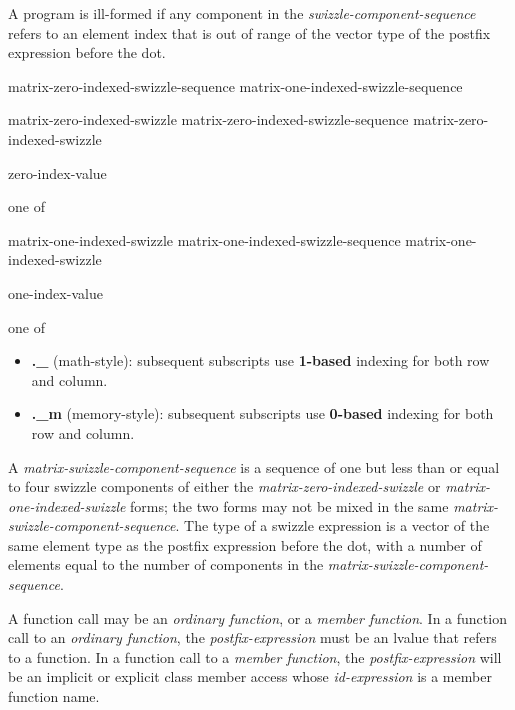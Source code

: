 \p A program is ill-formed if any component in the \textit{swizzle-component-sequence}
refers to an element index that is out of range of the vector type of the
postfix expression before the dot.

\begin{grammar}
  \br
  matrix-zero-indexed-swizzle-sequence\br
  matrix-one-indexed-swizzle-sequence\br

  \br
  matrix-zero-indexed-swizzle\br
  matrix-zero-indexed-swizzle-sequence matrix-zero-indexed-swizzle\br

  \br
   zero-index-value\br

   \textnormal{one of}\br
  \br

  \br
  matrix-one-indexed-swizzle\br
  matrix-one-indexed-swizzle-sequence matrix-one-indexed-swizzle\br

  \br
   one-index-value\br

   \textnormal{one of}\br
  \br
\end{grammar}
\begin{itemize}
\item \textbf{.\_} (math-style): subsequent subscripts use \textbf{1-based}
 indexing for both row and column.
\item \textbf{.\_m} (memory-style): subsequent subscripts use \textbf{0-based}
 indexing for both row and column.
\end{itemize}

\p A \textit{matrix-swizzle-component-sequence} is a sequence of one but less
than or equal to four swizzle components of either the
\textit{matrix-zero-indexed-swizzle} or \textit{matrix-one-indexed-swizzle}
forms; the two forms may not be mixed in the same 
\textit{matrix-swizzle-component-sequence}. The type of a swizzle expression is
a vector of the same element type as the postfix expression before the dot,
with a number of elements equal to the number of components in the
\textit{matrix-swizzle-component-sequence}.


\p A function call may be an \textit{ordinary function}, or a \textit{member
function}. In a function call to an \textit{ordinary function}, the
\textit{postfix-expression} must be an lvalue that refers to a function. In a
function call to a \textit{member function}, the \textit{postfix-expression}
will be an implicit or explicit class member access whose \textit{id-expression}
is a member function name.

